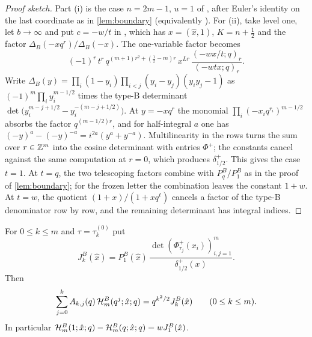 \begin{proof}[Proof sketch]
Part (i) is the case $n=2m-1$, $u=1$ of \cite[Theorem~3.7]{BW15}, after Euler's identity on the last coordinate as in \cref{lem:boundary} (equivalently \cite[Lemma~2.1]{CTW26}). For (ii), take level one, let $b\to\infty$ and put $c=-w/t$ in \cite[(5.6b)]{BW15}, which has $x=(\hat x,1)$, $K=n+\frac12$ and the factor $\Delta_B(-xq^r)/\Delta_B(-x)$. The one-variable factor becomes
\[
(-1)^{r}\,t^{r}\,q^{(m+1)r^2+(\frac12-m)r}\,x^{Lr}\,\frac{(-wx/t;q)_r}{(-wtx;q)_r}.
\]
Write $\Delta_B(y)=\prod_i(1-y_i)\prod_{i<j}(y_i-y_j)(y_iy_j-1)$ as $(-1)^m\prod_iy_i^{m-1/2}$ times the type-B determinant $\det\bigl(y_i^{m-j+1/2}-y_i^{-(m-j+1/2)}\bigr)$. At $y=-xq^r$ the monomial $\prod_i(-x_iq^{r_i})^{m-1/2}$ absorbs the factor $q^{(m-1/2)r}$, and for half-integral $a$ one has $(-y)^a-(-y)^{-a}=i^{2a}(y^a+y^{-a})$. Multilinearity in the rows turns the sum over $r\in\mathbb{Z}^m$ into the cosine determinant with entries $\Phi^+$; the constants cancel against the same computation at $r=0$, which produces $\delta^+_{1/2}$. This gives the case $t=1$. At $t=q$, the two telescoping factors combine with $P^B_q/P^B_1$ as in the proof of \cref{lem:boundary}; for the frozen letter the combination leaves the constant $1+w$. At $t=w$, the quotient $(1+x)/(1+xq^\ell)$ cancels a factor of the type-B denominator row by row, and the remaining determinant has integral indices.
\end{proof}

\begin{lemma}\label{lem:evenB}
For $0\le k\le m$ and $\tau=\tau^{(0)}_k$ put
\[
J^B_k(\hat x)=P^B_1(\hat x)\,\frac{\det(\Phi^+_{\tau_j}(x_i))_{i,j=1}^m}{\delta^+_{1/2}(x)}.
\]
Then
\[
\sum_{j=0}^kA_{k,j}(q)\,\mathcal{H}^B_m(q^j;\hat x;q)=q^{k^2/2}J^B_k(\hat x)\qquad(0\le k\le m).
\]
In particular $\mathcal{H}^B_m(1;\hat x;q)-\mathcal{H}^B_m(q;\hat x;q)=wJ^B_1(\hat x)$.
\end{lemma}

